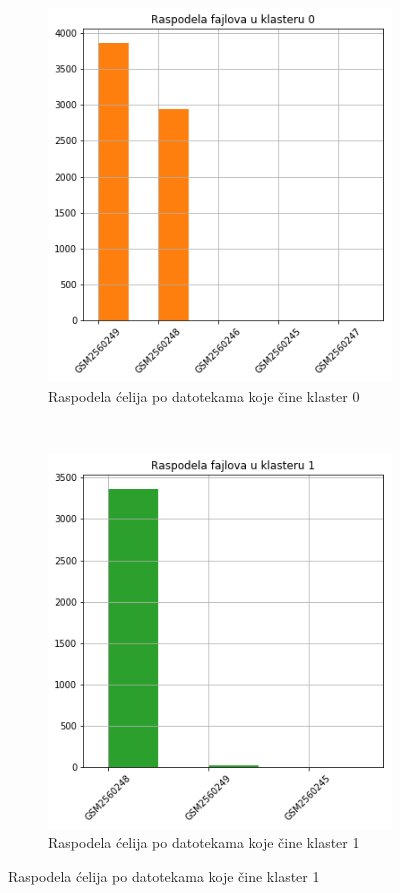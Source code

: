 \documentclass[a4paper]{article}
\begin{document}
\begin{figure}[H]
	

	\begin{subfigure}[normla]{0.3\textwidth}
		\includegraphics[scale=0.3]{bar_spektral_cosine_klaster0}
		\caption{Raspodela ćelija po datotekama koje čine klaster 0}
		\label{bar_spektral_cosine_klaster0}
	\end{subfigure}
	~
	\begin{subfigure}[normla]{0.3\textwidth}
		\includegraphics[scale=0.3]{bar_spektral_cosine_klaster1}
		\caption{Raspodela ćelija po datotekama koje čine klaster 1}

\end{subfigure}
\end{figure}
\end{document}
